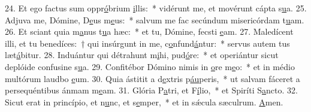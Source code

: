 24. Et ego factus sum oppr\uline{ó}brium \uline{i}llis:~* vidérunt me, et movérunt cápta s\uline{u}a.
25. Adjuva me, Dómine, D\uline{e}us m\uline{e}us:~* salvum me fac secúndum misericórdam t\uline{u}am.
26. Et sciant quia m\uline{a}nus t\uline{u}a hæc:~* et tu, Dómine, fecsti \uline{e}am.
27. Maledícent illi, et tu benedíces:~† qui insúrgunt in me, c\uline{o}nfund\uline{á}ntur:~* servus autem tus læt\uline{á}bitur.
28. Induántur qui détrahunt m\uline{i}hi, pud\uline{ó}re:~* et operiántur sicut deplóide confusine s\uline{u}a.
29. Confitébor Dómino nimis in \uline{o}re m\uline{e}o:~* et in médio multórum laudbo \uline{e}um.
30. Quia ástitit a d\uline{e}xtris p\uline{áu}peris,~* ut salvam fáceret a persequéntibus ánmam m\uline{e}am.
31. Glória P\uline{a}tri, et F\uline{í}lio,~* et Spiríti S\uline{a}ncto.
32. Sicut erat in princípio, et n\uline{u}nc, et s\uline{e}mper,~* et in sǽcula sæculrum. \uline{A}men.
